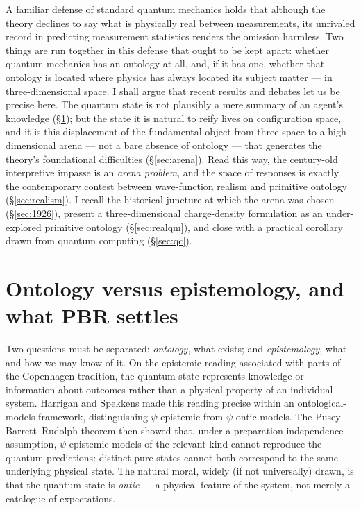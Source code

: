 \documentclass[11pt]{article}
\begin{document}
A familiar defense of standard quantum mechanics holds that although the theory declines to say what is
physically real between measurements, its unrivaled record in predicting measurement statistics renders the
omission harmless. Two things are run together in this defense that ought to be kept apart: whether quantum
mechanics has an ontology at all, and, if it has one, whether that ontology is located where physics has always
located its subject matter --- in three-dimensional space. I shall argue that recent results and debates let us
be precise here. The quantum state is not plausibly a mere summary of an agent's knowledge (\S\ref{sec:pbr});
but the state it is natural to reify lives on configuration space, and it is this displacement of the fundamental
object from three-space to a high-dimensional arena --- not a bare absence of ontology --- that generates the
theory's foundational difficulties (\S\ref{sec:arena}). Read this way, the century-old interpretive impasse is an
\emph{arena problem}, and the space of responses is exactly the contemporary contest between wave-function
realism and primitive ontology (\S\ref{sec:realism}). I recall the historical juncture at which the arena was
chosen (\S\ref{sec:1926}), present a three-dimensional charge-density formulation as an under-explored primitive
ontology (\S\ref{sec:realqm}), and close with a practical corollary drawn from quantum computing
(\S\ref{sec:qc}).

\section{Ontology versus epistemology, and what PBR settles}\label{sec:pbr}

Two questions must be separated: \emph{ontology}, what exists; and \emph{epistemology}, what and how we may know
of it. On the epistemic reading associated with parts of the Copenhagen tradition, the quantum state represents
knowledge or information about outcomes rather than a physical property of an individual system. Harrigan and
Spekkens \cite{HarriganSpekkens} made this reading precise within an ontological-models framework, distinguishing
$\psi$-epistemic from $\psi$-ontic models. The Pusey--Barrett--Rudolph theorem \cite{PBR} then showed that, under
a preparation-independence assumption, $\psi$-epistemic models of the relevant kind cannot reproduce the quantum
predictions: distinct pure states cannot both correspond to the same underlying physical state. The natural
moral, widely (if not universally) drawn, is that the quantum state is \emph{ontic} --- a physical feature of the
system, not merely a catalogue of expectations.
\end{document}
